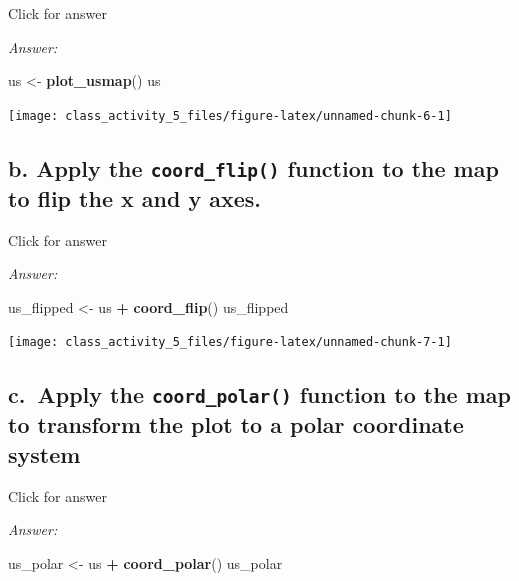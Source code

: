 \documentclass[
]{book}
\newenvironment{Shaded}{\begin{snugshade}}{\end{snugshade}}
\newcommand{\FunctionTok}[1]{\textcolor[rgb]{0.13,0.29,0.53}{\textbf{#1}}}
\newcommand{\NormalTok}[1]{#1}
\newcommand{\OtherTok}[1]{\textcolor[rgb]{0.56,0.35,0.01}{#1}}
\newcommand{\SpecialCharTok}[1]{\textcolor[rgb]{0.81,0.36,0.00}{\textbf{#1}}}
\begin{document}
Click for answer

\emph{Answer:}

\begin{Shaded}
\begin{Highlighting}[]
\NormalTok{us }\OtherTok{\textless{}{-}} \FunctionTok{plot\_usmap}\NormalTok{()}
\NormalTok{us}
\end{Highlighting}
\end{Shaded}

\texttt{[image: class\_activity\_5\_files/figure-latex/unnamed-chunk-6-1]}

\hypertarget{b.-apply-the-coord_flip-function-to-the-map-to-flip-the-x-and-y-axes.}{%
\subsection{\texorpdfstring{b. Apply the \texttt{coord\_flip()} function to the map to flip the x and y axes.}{b. Apply the coord\_flip() function to the map to flip the x and y axes.}}\label{b.-apply-the-coord_flip-function-to-the-map-to-flip-the-x-and-y-axes.}}

Click for answer

\emph{Answer:}

\begin{Shaded}
\begin{Highlighting}[]
\NormalTok{us\_flipped }\OtherTok{\textless{}{-}}\NormalTok{ us }\SpecialCharTok{+} \FunctionTok{coord\_flip}\NormalTok{()}
\NormalTok{us\_flipped}
\end{Highlighting}
\end{Shaded}

\texttt{[image: class\_activity\_5\_files/figure-latex/unnamed-chunk-7-1]}

\hypertarget{c.-apply-the-coord_polar-function-to-the-map-to-transform-the-plot-to-a-polar-coordinate-system}{%
\subsection{\texorpdfstring{c.~Apply the \texttt{coord\_polar()} function to the map to transform the plot to a polar coordinate system}{c.~Apply the coord\_polar() function to the map to transform the plot to a polar coordinate system}}\label{c.-apply-the-coord_polar-function-to-the-map-to-transform-the-plot-to-a-polar-coordinate-system}}

Click for answer

\emph{Answer:}

\begin{Shaded}
\begin{Highlighting}[]
\NormalTok{us\_polar }\OtherTok{\textless{}{-}}\NormalTok{ us }\SpecialCharTok{+} \FunctionTok{coord\_polar}\NormalTok{()}
\NormalTok{us\_polar}
\end{Highlighting}
\end{Shaded}
\end{document}

